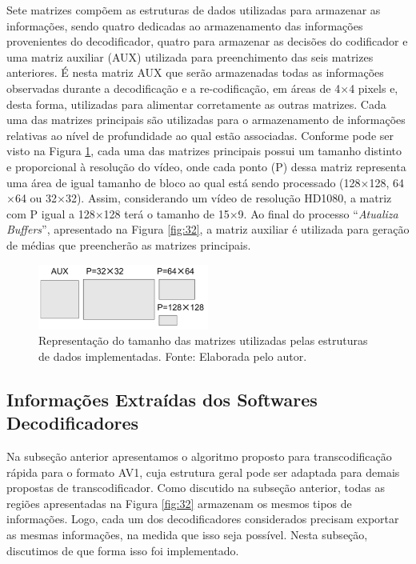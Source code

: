 Sete matrizes compõem as estruturas de dados utilizadas para armazenar as informações, sendo quatro dedicadas ao armazenamento das informações provenientes do decodificador, quatro para armazenar as decisões do codificador e uma matriz auxiliar (AUX) utilizada para preenchimento das seis matrizes anteriores. É nesta matriz AUX que serão armazenadas todas as informações observadas durante a decodificação e a re-codificação, em áreas de 4$\times$4 pixels e, desta forma, utilizadas para alimentar corretamente as outras matrizes. Cada uma das matrizes principais são utilizadas para o armazenamento de informações relativas ao nível de profundidade ao qual estão associadas. Conforme pode ser visto na Figura \ref{fig:33}, cada uma das matrizes principais possui um tamanho distinto e proporcional à resolução do vídeo, onde cada ponto (P) dessa matriz representa uma área de igual tamanho de bloco ao qual está sendo processado (128$\times$128, 64$\times$64 ou 32$\times$32). Assim, considerando um vídeo de resolução HD1080, a matriz com P igual a 128$\times$128 terá o tamanho de 15$\times$9. Ao final do processo ``\textit{Atualiza Buffers}'', apresentado na Figura \ref{fig:32}, a matriz auxiliar é utilizada para geração de médias que preencherão as matrizes principais.

\begin{figure}
    \centering
    \includegraphics[width=0.5\textwidth]{FIGURES/fig_33.png}
    \caption{Representação do tamanho das matrizes utilizadas pelas estruturas de dados implementadas. Fonte: Elaborada pelo autor.}
    \label{fig:33}
\end{figure}

\subsection{Informações Extraídas dos Softwares Decodificadores}
\label{cap:7.4.2}

Na subseção anterior apresentamos o algoritmo proposto para transcodificação rápida para o formato AV1, cuja estrutura geral pode ser adaptada para demais propostas de transcodificador. Como discutido na subseção anterior, todas as regiões apresentadas na Figura \ref{fig:32} armazenam os mesmos tipos de informações. Logo, cada um dos decodificadores considerados precisam exportar as mesmas informações, na medida que isso seja possível. Nesta subseção, discutimos de que forma isso foi implementado.

